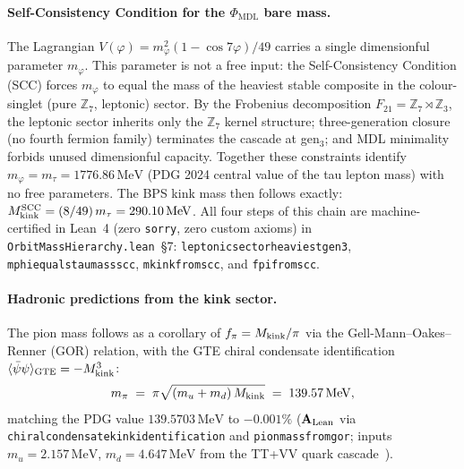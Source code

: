 \documentclass[12pt,letterpaper]{article}
\newcommand{\CatAL}{\ensuremath{\textbf{A}_{\rm Lean}}}
\newcommand{\lean}[1]{%
  \penalty-100
  \begingroup\def\_{\textunderscore\allowbreak}\texttt{#1}\endgroup}
\begin{document}
\paragraph{Self-Consistency Condition for the $\Phi_{\mathrm{MDL}}$ bare mass.}
The Lagrangian $V(\varphi) = m_\varphi^2(1 - \cos 7\varphi)/49$ carries a
single dimensionful parameter $m_\varphi$.  This parameter is not a free input:
the Self-Consistency Condition (SCC) forces $m_\varphi$ to equal the mass of
the heaviest stable composite in the colour-singlet (pure $\mathbb{Z}_7$,
leptonic) sector.  By the Frobenius decomposition
$F_{21} = \mathbb{Z}_7 \rtimes \mathbb{Z}_3$, the leptonic sector inherits
only the $\mathbb{Z}_7$ kernel structure; three-generation closure (no fourth
fermion family) terminates the cascade at gen$_3$; and MDL minimality forbids
unused dimensionful capacity.  Together these constraints identify
$m_\varphi = m_\tau = 1776.86\,\mathrm{MeV}$ (PDG 2024 central value of the
tau lepton mass) with no free parameters.  The BPS kink mass then follows
exactly: $M_{\rm kink}^{\rm SCC} = (8/49)\,m_\tau = 290.10\,\mathrm{MeV}$.
All four steps of this chain are machine-certified in Lean~4 (zero
\texttt{sorry}, zero custom axioms) in
\lean{OrbitMassHierarchy.lean}~\S7: \lean{leptonic\_sector\_heaviest\_gen3},
\lean{mphi\_equals\_tau\_mass\_scc}, \lean{mkink\_from\_scc}, and
\lean{fpi\_from\_scc}.

\paragraph{Hadronic predictions from the kink sector.}
The pion mass follows as a corollary of $f_\pi = M_{\rm kink}/\pi$ via the
Gell-Mann--Oakes--Renner (GOR) relation, with the GTE chiral condensate
identification $\langle\bar\psi\psi\rangle_{\rm GTE} = -M_{\rm kink}^3$:
\begin{equation}
  m_\pi \;=\; \pi\sqrt{(m_u + m_d)\,M_{\rm kink}}
  \;=\; 139.57\,\mathrm{MeV},
  \label{eq:mpion}
\end{equation}
matching the PDG value $139.5703\,\mathrm{MeV}$ to $-0.001\%$ ($\CatAL$ via
\lean{chiral\_condensate\_kink\_identification} and \lean{pion\_mass\_from\_gor}; inputs
$m_u = 2.157\,\mathrm{MeV}$, $m_d = 4.647\,\mathrm{MeV}$ from the TT+VV
quark cascade~\cite{SpivackGTEQCDStructure}).
\end{document}
